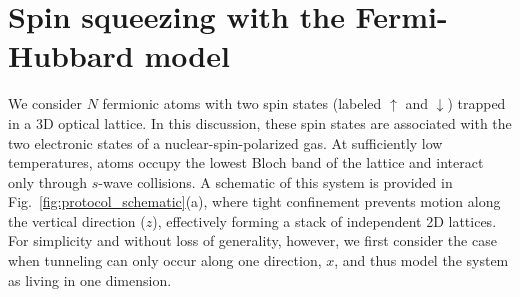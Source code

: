 \documentclass[aps,prx,superscriptaddress,notitlepage,twocolumn,longbibliography]{revtex4-2}
\newcommand{\up}{\uparrow}
\newcommand{\dn}{\downarrow}
\begin{document}
\section{Spin squeezing with the Fermi-Hubbard model}
\label{sec:theory}

We consider $N$ fermionic atoms with two spin states (labeled $\up$ and $\dn$) trapped in a 3D optical lattice.
In this discussion, these spin states are associated with the two electronic states of a nuclear-spin-polarized gas.
At sufficiently low temperatures, atoms  occupy the lowest Bloch band of the lattice and interact only through $s$-wave collisions.
A schematic of this system is provided in Fig.~\ref{fig:protocol_schematic}(a), where tight confinement prevents motion along the vertical direction ($z$), effectively forming a stack of independent 2D lattices.
For simplicity and without loss of generality, however, we first consider the case when tunneling can only occur along one direction, $x$, and thus model the system as living in  one dimension.
\end{document}
